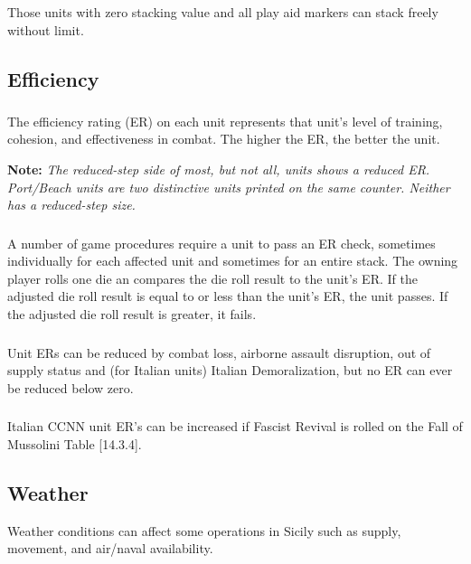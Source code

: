 \subsubsection{}
Those units with zero stacking value and all play aid markers can stack freely without limit.

\subsection{Efficiency}

\subsubsection{}
The efficiency rating (ER) on each unit represents that unit's level of training, cohesion, and effectiveness in combat. The higher the ER, the better the unit.

\textbf{Note:} \textit{The reduced-step side of most, but not all, units shows a reduced ER. Port/Beach units are two distinctive units printed on the same counter. Neither has a reduced-step size.}

\subsubsection{}
A number of game procedures require a unit to pass an ER check, sometimes individually for each affected unit and sometimes for an entire stack. The owning player rolls one die an compares the die roll result to the unit's ER. If the adjusted die roll result is equal to or less than the unit's ER, the unit passes. If the adjusted die roll result is greater, it fails.

\subsubsection{}
Unit ERs can be reduced by combat loss, airborne assault disruption, out of supply status and (for Italian units) Italian Demoralization, but no ER can ever be reduced below zero.

\subsubsection{}
Italian CCNN unit ER's can be increased if Fascist Revival is rolled on the Fall of Mussolini Table [14.3.4].

\subsection{Weather}
Weather conditions can affect some operations in Sicily such as supply, movement, and air/naval availability.


